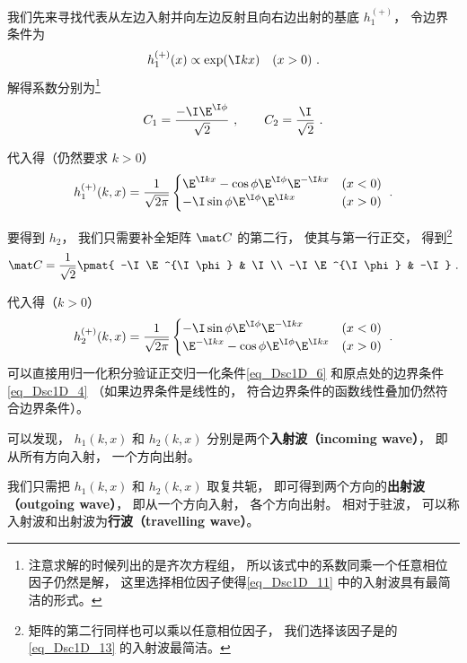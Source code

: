 我们先来寻找代表从左边入射并向左边反射且向右边出射的基底 $h_1^{(+)}$， 令边界条件为
\begin{equation}
h_1^{(+)}(x) \propto \exp(\I k x) \quad (x > 0)~.
\end{equation}
解得系数分别为\footnote{注意求解的时候列出的是齐次方程组， 所以该式中的系数同乘一个任意相位因子仍然是解， 这里选择相位因子使得\autoref{eq_Dsc1D_11} 中的入射波具有最简洁的形式。}
\begin{equation}
C_1 = \frac{-\I\E^{\I \phi}}{\sqrt{2}}~, \qquad
C_2 =  \frac{\I}{\sqrt{2}}~.
\end{equation}

代入得（仍然要求 $k > 0$）
\begin{equation}\label{eq_Dsc1D_11}
h_1^{(+)}(k, x) =  \frac{1}{\sqrt{2\pi}}
\begin{cases}
\E^{\I kx} - \cos\phi \E^{\I\phi} \E^{-\I k x} & (x < 0) \\
-\I\sin\phi\E^{\I\phi} \E^{\I kx}  & (x > 0)
\end{cases}~.
\end{equation}

要得到 $h_2$， 我们只需要补全矩阵 $\mat C$ 的第二行， 使其与第一行正交， 得到\footnote{矩阵的第二行同样也可以乘以任意相位因子， 我们选择该因子是的\autoref{eq_Dsc1D_13} 的入射波最简洁。}
\begin{equation}
\mat C = \frac{1}{\sqrt{2}}\pmat{
-\I\E^{\I \phi} & \I \\
-\I\E^{\I \phi} & -\I
}~.\end{equation}

代入得（$k > 0$）
\begin{equation}\label{eq_Dsc1D_13}
h_2^{(+)}(k, x) =  \frac{1}{\sqrt{2\pi}}
\begin{cases}
-\I\sin\phi\E^{\I\phi}\E^{-\I kx} &(x < 0) \\
\E^{-\I kx} - \cos\phi \E^{\I \phi} \E^{\I kx} &(x > 0)
\end{cases}~.
\end{equation}
可以直接用归一化积分验证正交归一化条件\autoref{eq_Dsc1D_6} 和原点处的边界条件\autoref{eq_Dsc1D_4} （如果边界条件是线性的， 符合边界条件的函数线性叠加仍然符合边界条件）。

可以发现， $h_1(k, x)$ 和 $h_2(k, x)$ 分别是两个\textbf{入射波（incoming wave）}， 即从所有方向入射， 一个方向出射。

我们只需把 $h_1(k, x)$ 和 $h_2(k, x)$ 取复共轭， 即可得到两个方向的\textbf{出射波（outgoing wave）}， 即从一个方向入射， 各个方向出射。 相对于驻波， 可以称入射波和出射波为\textbf{行波（travelling wave）}。

